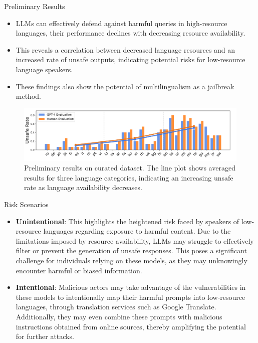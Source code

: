 \begin{frame}{Preliminary Results}
    \begin{itemize}
        \item LLMs can effectively defend against harmful queries in high-resource languages, their performance declines with decreasing resource availability.
        \item This reveals a correlation between decreased language resources and an increased rate of unsafe outputs, indicating potential risks for low-resource language speakers.
        \item These findings also show the potential of multilingualism as a jailbreak method.
    \end{itemize}
    \begin{figure}
            \centering
            \includegraphics[width=\linewidth]{pic/Prelim Results.png}
            \caption{Preliminary results on curated dataset. The line plot shows averaged results for three language categories, indicating an increasing unsafe rate as language availability decreases.}
            \label{fig:prelim_results}
        \end{figure}
\end{frame}

\begin{frame}{Risk Scenarios}
    \begin{itemize}
        \item \textbf{Unintentional}: This highlights the heightened risk faced by speakers of low-resource languages regarding exposure to harmful content. Due to the limitations imposed by resource availability, LLMs may struggle to effectively filter or prevent the generation of unsafe responses. This poses a significant challenge for individuals relying on these models, as they may unknowingly encounter harmful or biased information.
        \item \textbf{Intentional}: Malicious actors may take advantage of the vulnerabilities in these models to intentionally map their harmful prompts into low-resource languages, through translation services such as Google Translate. Additionally, they may even combine these prompts with malicious instructions obtained from online sources, thereby amplifying the potential for further attacks.
    \end{itemize}
\end{frame}